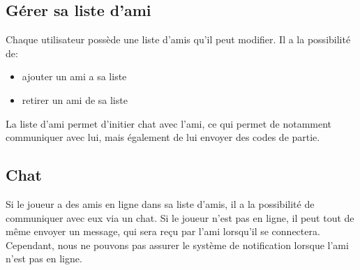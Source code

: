 \documentclass[../besoin_user.tex]{subfiles}
\begin{document}
\subsection{Gérer sa liste d'ami}
Chaque utilisateur possède une liste d'amis qu'il peut modifier. Il a la possibilité de:
\begin{itemize}
    \item ajouter un ami a sa liste
    \item retirer un ami de sa liste
\end{itemize}
La liste d'ami permet d'initier chat avec l'ami, ce qui permet de notamment communiquer avec lui, mais également de lui envoyer des codes de partie.

\subsection{Chat}
Si le joueur a des amis en ligne dans sa liste d'amis, il a la possibilité de communiquer avec eux via un chat. 
Si le joueur n'est pas en ligne, il peut tout de même envoyer un message, qui sera reçu par l'ami lorsqu'il se connectera.
Cependant, nous ne pouvons pas assurer le système de notification lorsque l'ami n'est pas en ligne.
\end{document}
